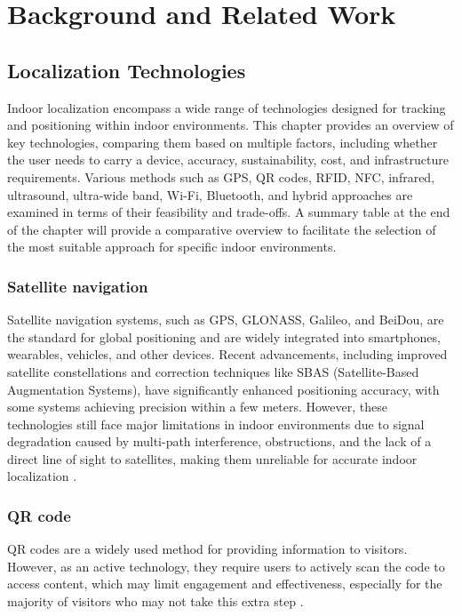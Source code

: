 \chapter{Background and Related Work}
\label{chap:background}

\section{Localization Technologies}

Indoor localization encompass a wide range of technologies designed for tracking and positioning within indoor environments. This chapter provides an overview of key technologies, comparing them based on multiple factors, including whether the user needs to carry a device, accuracy, sustainability, cost, and infrastructure requirements. Various methods such as GPS, QR codes, RFID, NFC, infrared, ultrasound, ultra-wide band, Wi-Fi, Bluetooth, and hybrid approaches are examined in terms of their feasibility and trade-offs. A summary table at the end of the chapter will provide a comparative overview to facilitate the selection of the most suitable approach for specific indoor environments.

\subsection{Satellite navigation}

Satellite navigation systems, such as GPS, GLONASS, Galileo, and BeiDou, are the standard for global positioning and are widely integrated into smartphones, wearables, vehicles, and other devices. Recent advancements, including improved satellite constellations and correction techniques like SBAS (Satellite-Based Augmentation Systems), have significantly enhanced positioning accuracy, with some systems achieving precision within a few meters. However, these technologies still face major limitations in indoor environments due to signal degradation caused by multi-path interference, obstructions, and the lack of a direct line of sight to satellites, making them unreliable for accurate indoor localization \cite{mainetti_survey_2014}. 

\subsection{QR code}

QR codes are a widely used method for providing information to visitors. However, as an active technology, they require users to actively scan the code to access content, which may limit engagement and effectiveness, especially for the majority of visitors who may not take this extra step \cite{spachos_ble_2020}. 

